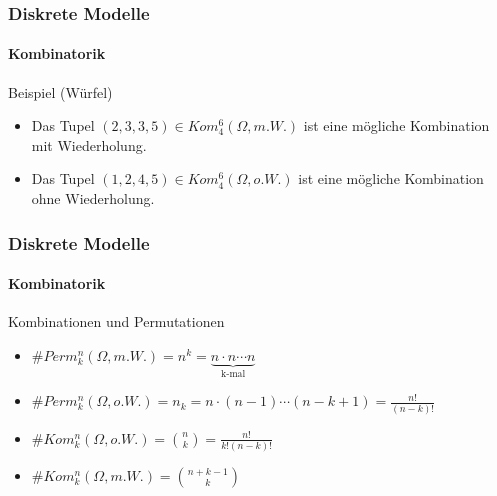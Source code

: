 \documentclass{beamer}
\begin{document}
\begin{frame}
    \frametitle{Diskrete Modelle}
\framesubtitle{Kombinatorik}
\begin{block}{Beispiel (Würfel)}
\begin{itemize}
\item Das Tupel $ (2,3,3,5 )  \in Kom_4^6(\Omega, m.W.)$ ist eine mögliche Kombination mit Wiederholung.
\item Das Tupel $(1,2,4,5) \in Kom_4^6(\Omega, o.W.)$ ist eine mögliche Kombination ohne Wiederholung.

\end{itemize}

\end{block}
 \end{frame}



\begin{frame}
    \frametitle{Diskrete Modelle}
\framesubtitle{Kombinatorik}

\begin{block}{Kombinationen und Permutationen}
\begin{itemize}
\item $\# Perm_k^n(\Omega, m.W.)  = n^k = \underbrace{n \cdot n \cdots n}_{\text{k-mal}}$
\item $\# Perm_k^n(\Omega, o.W.)  = n_k = n \cdot (n-1) \cdots  (n-k+1) = \frac{n!}{(n-k)!}$  
\item $\#Kom_k^n(\Omega, o.W.) = \binom{n}{k} = \frac{n!}{k! (n-k)!}$  
\item $\#Kom_k^n(\Omega, m.W.)  = \binom{n + k -1}{k}$  
\end{itemize}
\end{block}
 \end{frame}
\end{document}
